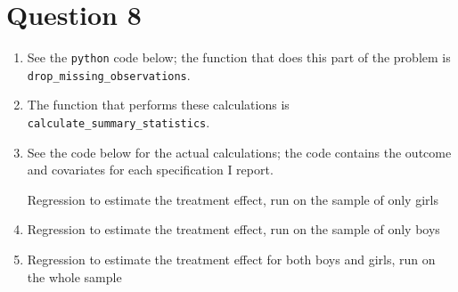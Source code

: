 \documentclass[11pt]{article}
\begin{document}
\section{Question 8}
\label{sec:org0a46612}
  \begin{enumerate}[label=\alph*)]
\item See the \verb|python| code below; the function that does this part of the problem is \verb|drop_missing_observations|.
\item The function that performs these calculations is \verb|calculate_summary_statistics|. 

\item See the code below for the actual calculations; the code contains the outcome and covariates for each specification I report.

\newpage
\begin{table}
\caption{Regression to estimate the treatment effect, run on the sample of only girls}

\end{table}

\item

\begin{table}
\caption{Regression to estimate the treatment effect, run on the sample of only boys}

\end{table}

\item 

\newpage
\begin{table}
\caption{Regression to estimate the treatment effect for both boys and girls, run on the whole sample}

\end{table}


\end{enumerate}
\end{document}
